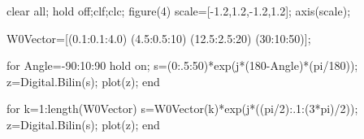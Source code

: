 \documentclass[11pt]{article}
\author{Christian}
\date{\today}
\title{}
\begin{document}
clear all; hold off;clf;clc;
figure(4)
scale=[-1.2,1.2,-1.2,1.2];
axis(scale);

W0Vector=[(0.1:0.1:4.0) (4.5:0.5:10) (12.5:2.5:20) (30:10:50)];

for Angle=-90:10:90
    hold on;
    s=(0:.5:50)*exp(j*(180-Angle)*(pi/180));
    z=Digital.Bilin(s);
    plot(z);
end

for k=1:length(W0Vector)
    s=W0Vector(k)*exp(j*((pi/2):.1:(3*pi)/2));
    z=Digital.Bilin(s);
    plot(z);  
end
\end{document}
